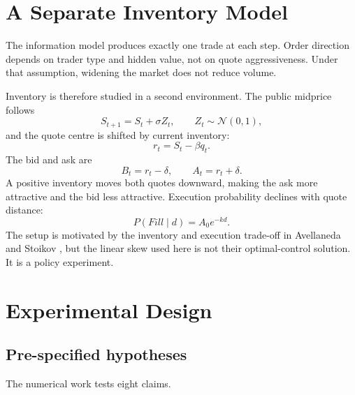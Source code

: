 \documentclass[11pt]{article}
\begin{document}
\section{A Separate Inventory Model}

The information model produces exactly one trade at each step. Order direction depends on trader type and hidden value, not on quote aggressiveness. Under that assumption, widening the market does not reduce volume.

Inventory is therefore studied in a second environment. The public midprice follows
\begin{equation}
S_{t+1}=S_t+\sigma Z_t, \qquad Z_t\sim\mathcal{N}(0,1),
\end{equation}
and the quote centre is shifted by current inventory:
\begin{equation}
r_t=S_t-\beta q_t.
\end{equation}
The bid and ask are
\begin{equation}
B_t=r_t-\delta, \qquad A_t=r_t+\delta.
\end{equation}
A positive inventory moves both quotes downward, making the ask more attractive and the bid less attractive. Execution probability declines with quote distance:
\begin{equation}
P(Fill\mid d)=A_0e^{-kd}.
\end{equation}
The setup is motivated by the inventory and execution trade-off in Avellaneda and Stoikov \cite{avellaneda_stoikov_2008}, but the linear skew used here is not their optimal-control solution. It is a policy experiment.

\section{Experimental Design}

\subsection{Pre-specified hypotheses}

The numerical work tests eight claims.
\end{document}
